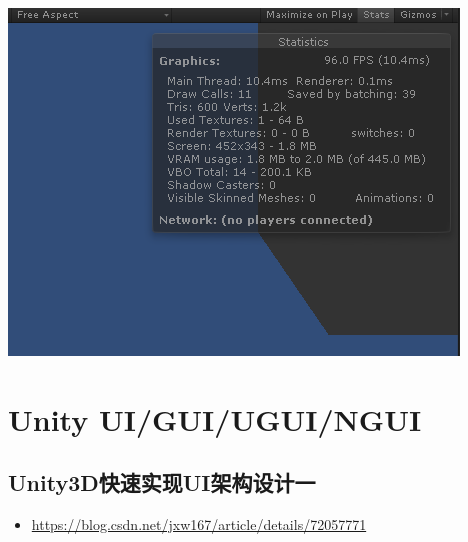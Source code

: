 \documentclass[9pt, b5paper]{article}
\begin{document}
\begin{center}
\includegraphics[width=.9\linewidth]{./pic/drawcall2.png}
\end{center}
\section{Unity UI/GUI/UGUI/NGUI}
\label{sec:org8dfef2a}
\subsection{Unity3D快速实现UI架构设计一}
\label{sec:org0395e8e}
\begin{itemize}
\item \url{https://blog.csdn.net/jxw167/article/details/72057771}
\end{itemize}
\end{document}
